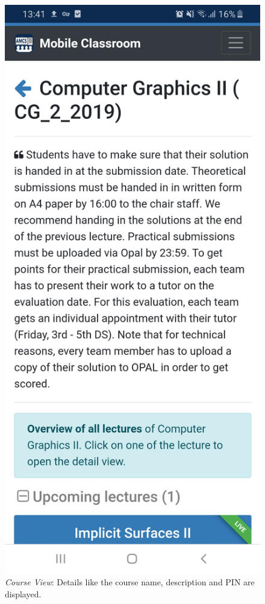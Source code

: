 \begin{figure}
\begin{minipage}[t]{.5\textwidth}
		\includegraphics[width=0.95\linewidth]{screenshots/course_view_1.jpg}
		\captionsetup{width=.8\linewidth}
		\caption{\emph{Course View}: Details like the course name, description and PIN are displayed.}

\end{minipage}
\end{figure}
